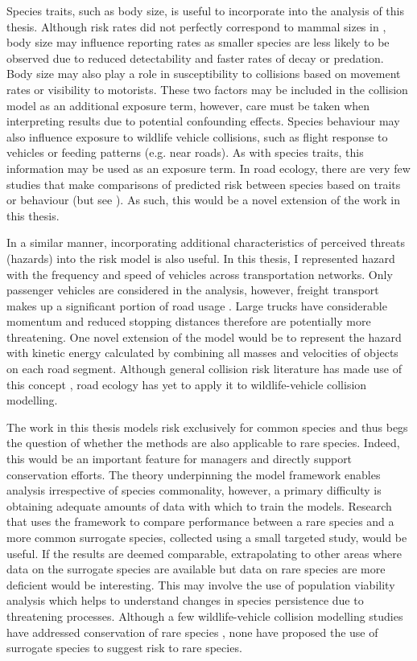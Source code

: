 Species traits, such as body size, is useful to incorporate into the analysis of this thesis. Although risk rates did not perfectly correspond to mammal sizes in , body size may influence reporting rates as smaller species are less likely to be observed due to reduced detectability and faster rates of decay or predation. Body size may also play a role in susceptibility to collisions based on movement rates \citep{} or visibility to motorists. These two factors may be included in the collision model as an additional exposure term, however, care must be taken when interpreting results due to potential confounding effects. Species behaviour may also influence exposure to wildlife vehicle collisions, such as flight response to vehicles \citep{} or feeding patterns (e.g. near roads). As with species traits, this information may be used as an exposure term. In road ecology, there are very few studies that make comparisons of predicted risk between species based on traits or behaviour (but see \cite{}). As such, this would be a novel extension of the work in this thesis. 

In a similar manner, incorporating additional characteristics of perceived threats (hazards) into the risk model is also useful. In this thesis, I represented hazard with the frequency and speed of vehicles across transportation networks. Only passenger vehicles are considered in the analysis, however, freight transport makes up a significant portion of road usage \citep{}. Large trucks have considerable momentum and reduced stopping distances therefore are potentially more threatening. One novel extension of the model would be to represent the hazard with kinetic energy calculated by combining all masses and velocities of objects on each road segment. Although general collision risk literature has made use of this concept \citep{}, road ecology has yet to apply it to wildlife-vehicle collision modelling.

The work in this thesis models risk exclusively for common species and thus begs the question of whether the methods are also applicable to rare species. Indeed, this would be an important feature for managers and directly support conservation efforts. The theory underpinning the model framework enables analysis irrespective of species commonality, however, a primary difficulty is obtaining adequate amounts of data with which to train the models. Research that uses the framework to compare performance between a rare species and a more common surrogate species, collected using a small targeted study, would be useful. If the results are deemed comparable, extrapolating to other areas where data on the surrogate species are available but data on rare species are more deficient would be interesting. This may involve the use of population viability analysis which helps to understand changes in species persistence due to threatening processes. Although a few wildlife-vehicle collision modelling studies have addressed conservation of rare species \citep{}, none have proposed the use of surrogate species to suggest risk to rare species.

